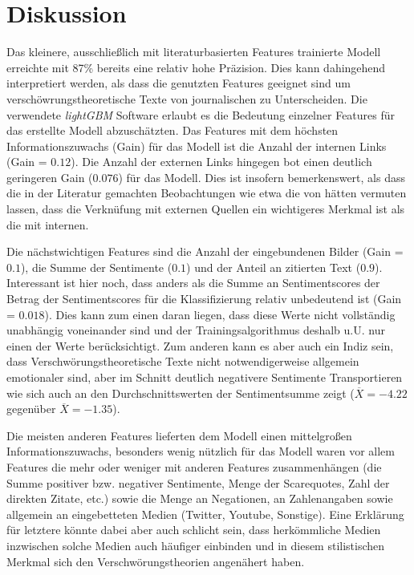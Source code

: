 \section{Diskussion}

Das kleinere, ausschließlich mit literaturbasierten Features trainierte Modell erreichte mit 87\% bereits eine relativ hohe Präzision.
Dies kann dahingehend interpretiert werden, als dass die genutzten Features geeignet sind um verschöwrungstheoretische Texte von journalischen zu Unterscheiden.
Die verwendete \textit{lightGBM} Software erlaubt es die Bedeutung einzelner Features für das erstellte Modell abzuschätzten.
Das Features mit dem höchsten Informationszuwachs (Gain) für das Modell ist die Anzahl der internen Links (Gain = $0.12$).
Die Anzahl der externen Links hingegen bot einen deutlich geringeren Gain ($0.076$) für das Modell.
Dies ist insofern bemerkenswert, als dass die in der Literatur gemachten Beobachtungen wie etwa die von \textcite[10]{soukup_2008} hätten vermuten lassen, dass die Verknüfung mit externen Quellen ein wichtigeres Merkmal ist als die mit internen.

Die nächstwichtigen Features sind die Anzahl der eingebundenen Bilder (Gain = $0.1$), die Summe der Sentimente ($0.1$) und der Anteil an zitierten Text ($0.9$).
Interessant ist hier noch, dass anders als die Summe an Sentimentscores der Betrag der Sentimentscores für die Klassifizierung relativ unbedeutend ist (Gain = $0.018$).
Dies kann zum einen daran liegen, dass diese Werte nicht vollständig unabhängig voneinander sind und der Trainingsalgorithmus deshalb u.U. nur einen der Werte berücksichtigt.
Zum anderen kann es aber auch ein Indiz sein, dass Verschwörungstheoretische Texte nicht notwendigerweise allgemein emotionaler sind, aber im Schnitt deutlich negativere Sentimente Transportieren wie sich auch an den Durchschnittswerten der Sentimentsumme zeigt ($\overline{X} = -4.22$ gegenüber $\overline{X} = -1.35$).

Die meisten anderen Features lieferten dem Modell einen mittelgroßen Informationszuwachs, besonders wenig nützlich für das Modell waren vor allem Features die mehr oder weniger mit anderen Features zusammenhängen (die Summe positiver bzw. negativer Sentimente, Menge der Scarequotes, Zahl der direkten Zitate, etc.) sowie die Menge an Negationen, an Zahlenangaben sowie allgemein an eingebetteten Medien (Twitter, Youtube, Sonstige).
Eine Erklärung für letztere könnte dabei aber auch schlicht sein, dass herkömmliche Medien inzwischen solche Medien auch häufiger einbinden und in diesem stilistischen Merkmal sich den Verschwörungstheorien angenähert haben.

